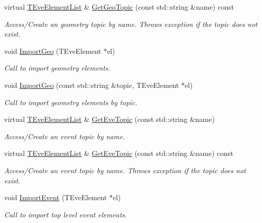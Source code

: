 \begin{DoxyCompactItemize}
virtual \hyperlink{class_t_eve_element_list}{TEveElementList} \& \hyperlink{class_d_d4hep_1_1_display_a4c0c974d99145c60440d2f0c06573f5b}{GetGeoTopic} (const std::string \&name) const 
\begin{DoxyCompactList}\small\item\em Access/Create an geometry topic by name. Throws exception if the topic does not exist. \item\end{DoxyCompactList}\item 
void \hyperlink{class_d_d4hep_1_1_display_aca9678df816ec896a38ff9c31019fba2}{ImportGeo} (TEveElement $\ast$el)
\begin{DoxyCompactList}\small\item\em Call to import geometry elements. \item\end{DoxyCompactList}\item 
void \hyperlink{class_d_d4hep_1_1_display_a668a093fb0bb46c6d83a6ddea832be0e}{ImportGeo} (const std::string \&topic, TEveElement $\ast$el)
\begin{DoxyCompactList}\small\item\em Call to import geometry elements by topic. \item\end{DoxyCompactList}\item 
virtual \hyperlink{class_t_eve_element_list}{TEveElementList} \& \hyperlink{class_d_d4hep_1_1_display_a515cf2ee2cb4e8219a30dc04bc2669b7}{GetEveTopic} (const std::string \&name)
\begin{DoxyCompactList}\small\item\em Access/Create an event topic by name. \item\end{DoxyCompactList}\item 
virtual \hyperlink{class_t_eve_element_list}{TEveElementList} \& \hyperlink{class_d_d4hep_1_1_display_a1900a9f343c5c9625331f36d7ca3d787}{GetEveTopic} (const std::string \&name) const 
\begin{DoxyCompactList}\small\item\em Access/Create an event topic by name. Throws exception if the topic does not exist. \item\end{DoxyCompactList}\item 
void \hyperlink{class_d_d4hep_1_1_display_a873232e99e43ac05e012104197a37777}{ImportEvent} (TEveElement $\ast$el)
\begin{DoxyCompactList}\small\item\em Call to import top level event elements. \item\end{DoxyCompactList}\item 

\end{DoxyCompactItemize}
